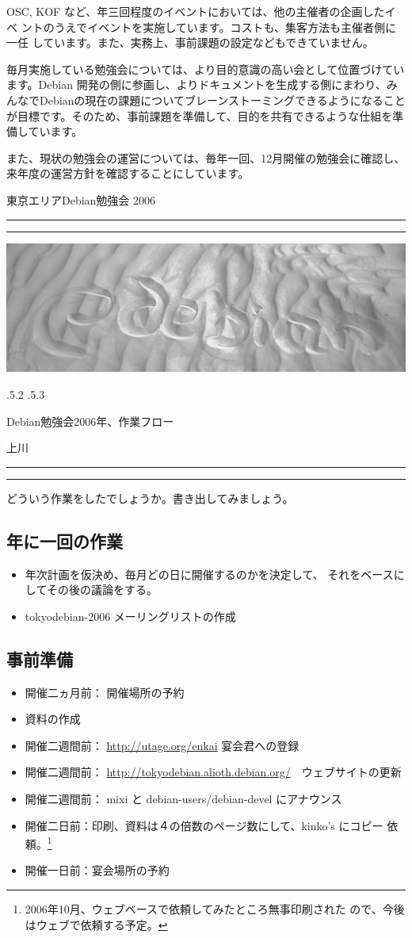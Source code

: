 \documentclass[mingoth,a4paper]{jsarticle}
\makeatletter
\renewcommand{\section}{\@startsection{section}{1}{\z@}%
    {\Cvs \@plus.5\Cdp \@minus.2\Cdp}%
    {.5\Cvs \@plus.3\Cdp}%
    {\normalfont\Huge\headfont\raggedright\centering}} %
\newcommand{\dancersection}[2]{%
\newpage
東京エリアDebian勉強会 2006
\hrule
\vspace{0.5mm}
\hrule
\hfill{}\includegraphics[width=16cm]{image2006-natsu/guruguru-sand-light.png}\\
\vspace{-5cm}
\begin{center}
\section{#1}
\end{center}
\hfill{}\colorbox{white}{#2}\hspace{3cm}\space\\
\vspace{1cm}
\hrule
\vspace{0.5mm}
\hrule
\vspace{1cm}
}
\makeatother
\begin{document}
OSC, KOF など、年三回程度のイベントにおいては、他の主催者の企画したイベ
ントのうえでイベントを実施しています。コストも、集客方法も主催者側に一任
しています。また、実務上、事前課題の設定などもできていません。

毎月実施している勉強会については、より目的意識の高い会として位置づけてい
ます。Debian 開発の側に参画し、よりドキュメントを生成する側にまわり、み
んなでDebianの現在の課題についてブレーンストーミングできるようになること
が目標です。そのため、事前課題を準備して、目的を共有できるような仕組を準
備しています。

また、現状の勉強会の運営については、毎年一回、12月開催の勉強会に確認し、
来年度の運営方針を確認することにしています。


\dancersection{Debian勉強会2006年、作業フロー}{上川}
\label{sec:debmtg2006flow}

どういう作業をしたでしょうか。書き出してみましょう。

\subsection{年に一回の作業}

\begin{itemize}
 \item 年次計画を仮決め、毎月どの日に開催するのかを決定して、
       それをベースにしてその後の議論をする。
 \item tokyodebian-2006 メーリングリストの作成
\end{itemize}

\subsection{事前準備}

\begin{itemize}
 \item 開催二ヵ月前： 開催場所の予約
 \item 資料の作成
 \item 開催二週間前： \url{http://utage.org/enkai} 宴会君への登録
 \item 開催二週間前： \url{http://tokyodebian.alioth.debian.org/}　ウェブサイトの更新
 \item 開催二週間前： mixi と debian-users/debian-devel にアナウンス
 \item 開催二日前：印刷、資料は４の倍数のページ数にして、kinko's にコピー
       依頼。\footnote{2006年10月、ウェブベースで依頼してみたところ無事印刷された
       ので、今後はウェブで依頼する予定。}
 \item 開催一日前：宴会場所の予約
\end{itemize}
\end{document}
